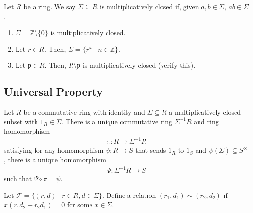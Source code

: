 \documentclass[10pt]{extarticle}
\newcommand{\Z}{\mathbb{Z}}
\begin{document}
  Let $R$ be a ring. We say $\Sigma \subseteq R$ is multiplicatively closed if, given $a,b\in \Sigma$, $ab \in \Sigma$.
  \begin{enumerate}[(1)]
    \item $\Sigma = \Z\setminus\{0\}$ is multiplicatively closed.
    \item Let $r\in R$. Then, $\Sigma = \{r^n\mid n\in\Z\}$.
    \item Let $\mathfrak{p}\in R$. Then, $R\setminus \mathfrak{p}$ is multiplicatively closed (verify this).
  \end{enumerate}
  \subsection{Universal Property}%
  Let $R$ be a commutative ring with identity and $\Sigma\subseteq R$ a multiplicatively closed subset with $1_R\in \Sigma$. There is a unique commutative ring $\Sigma^{-1}R$ and ring homomorphism
  \begin{align*}
   \pi: R\rightarrow \Sigma^{-1}R
  \end{align*}
  satisfying for any homomorphism $\psi: R\rightarrow S$ that sends $1_R$ to $1_S$ and $\psi(\Sigma) \subseteq S^{\times}$, there is a unique homomorphism
  \begin{align*}
   \Psi: \Sigma^{-1}R \rightarrow S
  \end{align*}
  such that $\Psi \circ \pi = \psi$.
  \begin{center}
  \end{center}
  Let $\mathcal{F} = \{(r,d)\mid r\in R,d\in \Sigma\}$. Define a relation $(r_1,d_1)\sim (r_2,d_2)$ if $x(r_1d_2 - r_2d_1)= 0$ for some $x\in \Sigma$.\\
\end{document}

